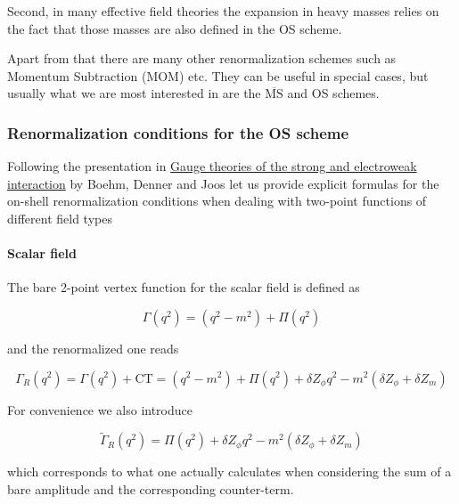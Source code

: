\documentclass[../FeynCalcManual.tex]{subfiles}
\begin{document}
Second, in many effective field theories the expansion in heavy masses
relies on the fact that those masses are also defined in the OS scheme.

Apart from that there are many other renormalization schemes such as
Momentum Subtraction (MOM) etc. They can be useful in special cases, but
usually what we are most interested in are the
\(\overline{\textrm{MS}}\) and OS schemes.

\hypertarget{renormalization-conditions-for-the-os-scheme}{%
\subsubsection{Renormalization conditions for the OS
scheme}\label{renormalization-conditions-for-the-os-scheme}}

Following the presentation in
\href{https://inspirehep.net/literature/571258}{Gauge theories of the
strong and electroweak interaction} by Boehm, Denner and Joos let us
provide explicit formulas for the on-shell renormalization conditions
when dealing with two-point functions of different field types

\hypertarget{scalar-field}{%
\paragraph{Scalar field}\label{scalar-field}}

The bare 2-point vertex function for the scalar field is defined as

\begin{equation}
\Gamma(q^2) = (q^2 - m^2) + \Pi(q^2)
\end{equation}

and the renormalized one reads

\begin{equation}
\Gamma_R(q^2) = \Gamma(q^2) + \textrm{CT} = (q^2 - m^2) + \Pi(q^2) + \delta Z_{\phi} q^2 - m^2 (\delta Z_{\phi} + \delta Z_{m}   )
\end{equation}

For convenience we also introduce

\begin{equation}
\tilde{\Gamma}_R(q^2) = \Pi(q^2) + \delta Z_{\phi} q^2 - m^2 (\delta Z_{\phi} + \delta Z_{m}   )
\end{equation}

which corresponds to what one actually calculates when considering the
sum of a bare amplitude and the corresponding counter-term.
\end{document}
